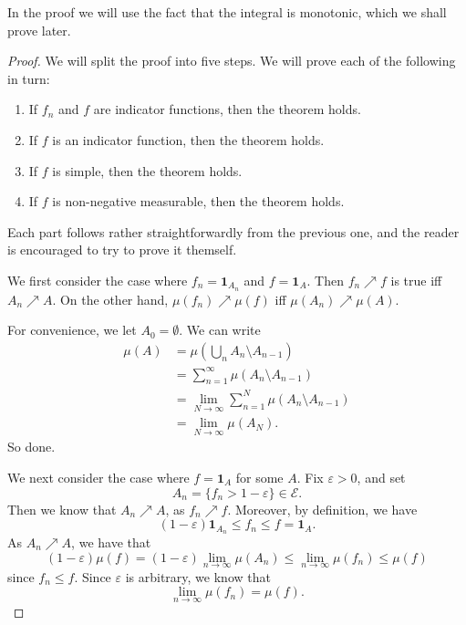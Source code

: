\documentclass[a4paper]{article}
\begin{document}
In the proof we will use the fact that the integral is monotonic, which we shall prove later.
\begin{proof}
  We will split the proof into five steps. We will prove each of the following in turn:
  \begin{enumerate}
    \item If $f_n$ and $f$ are indicator functions, then the theorem holds.
    \item If $f$ is an indicator function, then the theorem holds.
    \item If $f$ is simple, then the theorem holds.
    \item If $f$ is non-negative measurable, then the theorem holds.
  \end{enumerate}
  Each part follows rather straightforwardly from the previous one, and the reader is encouraged to try to prove it themself.

  \separator

  We first consider the case where $f_n = \mathbf{1}_{A_n}$ and $f = \mathbf{1}_A$. Then $f_n \nearrow f$ is true iff $A_n \nearrow A$. On the other hand, $\mu(f_n) \nearrow \mu(f)$ iff $\mu(A_n) \nearrow \mu(A)$.

  For convenience, we let $A_0 = \emptyset$. We can write
  \begin{align*}
    \mu(A) &= \mu\left(\bigcup_n A_n \setminus A_{n - 1}\right) \\
    &= \sum_{n = 1}^\infty \mu(A_n \setminus A_{n - 1}) \\
    &= \lim_{N \to \infty} \sum_{n = 1}^N \mu(A_n \setminus A_{n - 1}) \\
    &= \lim_{N \to \infty}\mu (A_N).
  \end{align*}
  So done.

  \separator

  We next consider the case where $f = \mathbf{1}_A$ for some $A$. Fix $\varepsilon > 0$, and set
  \[
    A_n = \{f_n > 1 - \varepsilon\} \in \mathcal{E}.
  \]
  Then we know that $A_n \nearrow A$, as $f_n \nearrow f$. Moreover, by definition, we have
  \[
    (1 - \varepsilon) \mathbf{1}_{A_n} \leq f_n \leq f = \mathbf{1}_A.
  \]
  As $A_n \nearrow A$, we have that
  \[
    (1 - \varepsilon) \mu(f) = (1 - \varepsilon) \lim_{n \to \infty} \mu(A_n) \leq \lim_{n \to \infty} \mu(f_n) \leq \mu(f)
  \]
  since $f_n \leq f$. Since $\varepsilon$ is arbitrary, we know that
  \[
    \lim_{n \to \infty} \mu(f_n) = \mu(f).
  \]

  \separator


\end{proof}
\end{document}
